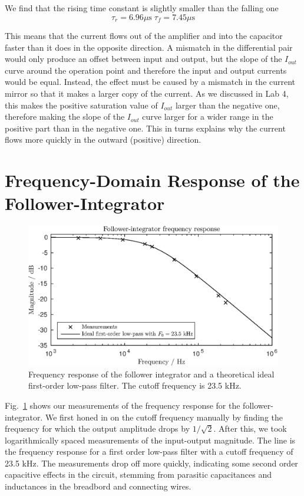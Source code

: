 We find that the rising time constant is slightly smaller than the falling one
\begin{equation*}
    \tau_r = 6.96\mu\mathrm{s} \; \tau_f = 7.45\mu\mathrm{s}
\end{equation*}

This means that the current flows out of the amplifier and into the capacitor faster than it does in the opposite direction. A mismatch in the differential pair would only produce an offset between input and output, but the slope of the \(I_{out}\) curve around the operation point and therefore the input and output currents would be equal. 
Instead, the effect must be caused by a mismatch in the current mirror so that it makes a larger copy of the current. As we discussed in Lab 4, this makes the positive saturation value of \(I_{out}\) larger than the negative one, therefore making the slope of the \(I_{out}\) curve larger for a wider range in the positive part than in the negative one. This in turns explains why the current flows more quickly in the outward (positive) direction. 


\section{Frequency-Domain Response of the Follower-Integrator}
\begin{figure}
    \center
    \includegraphics{ex3-freqresp.eps}
    \caption{Frequency response of the follower integrator and a theoretical ideal first-order low-pass filter. The cutoff frequency is 23.5 kHz.}
    \label{fig:ex3-1}
\end{figure}
Fig.~\ref{fig:ex3-1} shows our measurements of the frequency response for the follower-integrator. We first honed in on the cutoff frequency manually by finding the frequency for which the output amplitude drops by \(1/\sqrt 2\). 
After this, we took logarithmically spaced measurements of the input-output magnitude. The line is the frequency response for a first order low-pass
filter with a cutoff frequency of 23.5 kHz. The measurements drop off more quickly, indicating some second order capacitive effects in the circuit,
stemming from parasitic capacitances and inductances in the breadbord and connecting wires.

